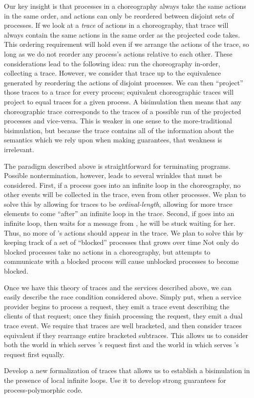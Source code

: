 Our key insight is that processes in a choreography always take the same actions in the same order, and actions can only be reordered between disjoint sets of processes.
If we look at a \emph{trace} of actions in a choreography, that trace will always contain the same actions in the same order as the projected code takes.
This ordering requirement will hold even if we arrange the actions of the trace, so long as we do not reorder any process's actions relative to each other.
These considerations lead to the following idea: run the choreography in-order, collecting a trace.
However, we consider that trace up to the equivalence generated by reordering the actions of disjoint processes.
We can then ``project'' those traces to a trace for every process; equivalent choreographic traces will project to equal traces for a given process.
A bisimulation then means that any choreographic trace corresponds to the traces of a possible run of the projected processes and vice-versa.
This is weaker in one sense to the more-traditional bisimulation, but because the trace contains all of the information about the semantics which we rely upon when making guarantees, that weakness is irrelevant.

The paradigm described above is straightforward for terminating programs.
Possible nontermination, however, leads to several wrinkles that must be considered.
First, if a process goes into an infinite loop in the choreography, no other events will be collected in the trace, even from other processes.
We plan to solve this by allowing for traces to be \emph{ordinal-length}, allowing for more trace elements to come ``after'' an infinite loop in the trace.
Second, if \Alice{} goes into an infinite loop, then \Bob{} waits for a message from \Alice, he will be stuck waiting for her.
Thus, no more of \Bob{}'s actions should appear in the trace.
We plan to solve this by keeping track of a set of ``blocked'' processes that grows over time
Not only do blocked processes take no actions in a choreography, but attempts to communicate with a blocked process will cause unblocked processes to become blocked.

Once we have this theory of traces and the services described above, we can easily describe the race condition considered above.
Simply put, when a service provider begins to process a request, they emit a trace event describing the clients of that request; once they finish processing the request, they emit a dual trace event.
We require that traces are well bracketed, and then consider traces equivalent if they rearrange entire bracketed subtraces.
This allows us to consider both the world in which \Alice{} serves \Bob{}'s request first and the world in which \Alice{} serves \Cathy{}'s request first equally.

\begin{goal}
  \label{goal:strong-epp}
  Develop a new formalization of traces that allows us to establish a bisimulation in the presence of local infinite loops.
  Use it to develop strong guarantees for process-polymorphic code.
\end{goal}
\fi


